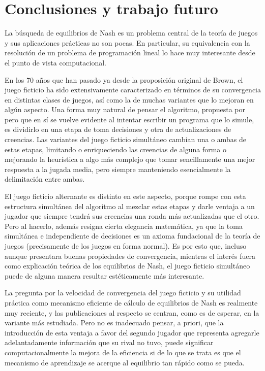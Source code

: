 \chapter{Conclusiones y trabajo futuro}

La búsqueda de equilibrios de Nash es un problema central de la teoría de juegos y sus aplicaciones prácticas no son pocas. En particular, su equivalencia con la resolución de un problema de programación lineal lo hace muy interesante desde el punto de vista computacional.

En los 70 años que han pasado ya desde la proposición original de Brown, el juego ficticio ha sido extensivamente caracterizado en términos de su convergencia en distintas clases de juegos, así como la de muchas variantes que lo mejoran en algún aspecto. Una forma muy natural de pensar el algoritmo, propuesta por \cite{extending:pattern} pero que en sí se vuelve evidente al intentar escribir un programa que lo simule, es dividirlo en una etapa de toma decisiones y otra de actualizaciones de creencias. Las variantes del juego ficticio simultáneo cambian una o ambas de estas etapas, limitando o enriqueciendo las creencias de alguna forma o mejorando la heurística a algo más complejo que tomar sencillamente una mejor respuesta a la jugada media, pero siempre manteniendo esencialmente la delimitación entre ambas.

El juego ficticio alternante es distinto en este aspecto, porque rompe con esta estructura simultánea del algoritmo al mezclar estas etapas y darle ventaja a un jugador que siempre tendrá sus creencias una ronda más actualizadas que el otro. Pero al hacerlo, además resigna cierta elegancia matemática, ya que la toma simultánea e independiente de decisiones es un axioma fundacional de la teoría de juegos (precisamente de los juegos en forma normal). Es por esto que, incluso aunque presentara buenas propiedades de convergencia, mientras el interés fuera como explicación teórica de los equilibrios de Nash, el juego ficticio simultáneo puede de alguna manera resultar estéticamente más interesante.

La pregunta por la velocidad de convergencia del juego ficticio y su utilidad práctica como mecanismo eficiente de cálculo de equilibrios de Nash es realmente muy reciente, y las publicaciones al respecto se centran, como es de esperar, en la variante más estudiada. Pero no es inadecuado pensar, a priori, que la introducción de esta ventaja a favor del segundo jugador que representa agregarle adelantadamente información que su rival no tuvo, puede significar computacionalmente la mejora de la eficiencia si de lo que se trata es que el mecanismo de aprendizaje se acerque al equilibrio tan rápido como se pueda.

